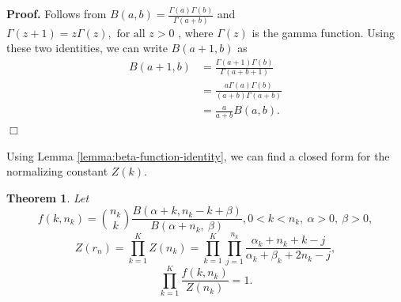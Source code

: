 \documentclass[officiallayout]{tktla}
\newtheorem{theorem}{Theorem}[chapter]
\newenvironment{proof}{\noindent\textbf{Proof.} }{$\Box$}
\begin{document}
\begin{proof}
  Follows from $B\left(a, b\right) = \frac{\Gamma\left(a\right)\Gamma\left(b\right)}{\Gamma\left(a + b\right)}$ \citep{artin_einfuhrung} and $\Gamma\left(z + 1\right) = z\Gamma\left(z\right), \text{ for all } z > 0$ \citep{davis_leonhard}, where $\Gamma\left(z\right)$ is the gamma function. Using these two identities, we can write $B\left(a + 1, b\right)$ as
  \begin{align*}
    B\left(a + 1, b\right) &= \frac{\Gamma\left(a + 1\right)\Gamma\left(b\right)}{\Gamma\left(a + b + 1\right)} \\
    &= \frac{a\Gamma\left(a\right)\Gamma\left(b\right)}{\left(a + b\right)\Gamma\left(a + b\right)} \\
    &= \frac{a}{a + b}B\left(a, b\right).
  \end{align*}
\end{proof}

Using Lemma \ref{lemma:beta-function-identity}, we can find a closed form for the normalizing constant $Z\left(k\right)$.
\begin{theorem}
  \label{theorem:likelihood-can-be-normalized}
  Let
  \[
  f\left(k, n_{k}\right) = \binom{n_{k}}{k}\frac{B\left(\alpha + k, n_{k} - k + \beta\right)}{B\left(\alpha + n_{k}, \: \beta\right)}, 0 < k < n_{k}, \: \alpha > 0, \: \beta > 0,
  \]
  \[
  Z\left(r_{n}\right) = \prod_{k = 1}^{K}Z\left(n_{k}\right) = \prod_{k = 1}^{K}\prod_{j = 1}^{n_{k}}\frac{\alpha_{k} + n_{k} + k - j}{\alpha_{k} + \beta_{k} + 2n_{k} - j},
  \]
  \[
  \prod_{k = 1}^{K} \frac{f\left(k, n_{k}\right)}{Z\left(n_{k}\right)} = 1.
  \]
\end{theorem}
\end{document}
